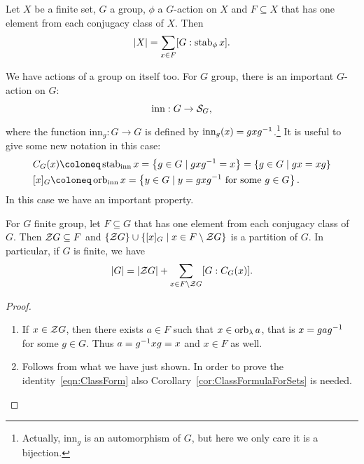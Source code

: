 \begin{corollary}\label{cor:ClassFormulaForSets}
Let \(X\) be a finite set, \(G\) a group, \(\phi\) a \(G\)-action on \(X\) and \(F \subseteq X\) that has one element from each conjugacy class of \(X\). Then
\[\left\lvert X\right\rvert = \sum_{x \in F} [G : \operatorname{stab}_\phi x] .\]
\end{corollary}

We have actions of a group on itself too. For \(G\) group, there is an important \(G\)-action on \(G\):
\[\text{inn} : G \to \mathcal S_G ,\]
where the function \(\text{inn}_g : G \to G\) is defined by \(\text{inn}_g(x) = g xg^{-1}\).\footnote{Actually, \(\text{inn}_g\) is an automorphism of \(G\), but here we only care it is a bijection.} It is useful to give some new notation in this case:
\begin{align*}
& C_G(x) \coloneq \stab_{\text{inn}} x = \set{g \in G \mid g x \inv g = x} = \set{g \in G \mid gx = xg} \\
& [x]_G \coloneq \orb_{\text{inn}} x = \set{y \in G \mid y = g x \inv g \text{ for some } g \in G} .
\end{align*}
In this case we have an important property.

\begin{proposition}\label{prop:ClassFormulaForGroups}
For \(G\) finite group, let \(F \subseteq G\) that has one element from each conjugacy class of \(G\). Then \(\mathcal Z G \subseteq F\) and \(\left\{\mathcal Z G\right\} \cup \left\{[x]_G \mid x \in F \setminus \mathcal Z G\right\}\) is a partition of \(G\). In particular, if \(G\) is finite, we have
\begin{equation}\left\lvert G\right\rvert = \left\lvert\mathcal Z G\right\rvert + \sum_{x \in F \setminus \mathcal Z G} [G:C_G(x)] .\label{eqn:ClassForm}\end{equation}
\end{proposition}

\begin{proof}
\begin{enumerate}
\item If \(x \in \mathcal Z G\), then there exists \(a \in F\) such that \(x \in \operatorname{orb}_\lambda a\), that is \(x = g a g^{-1}\) for some \(g \in G\). Thus \(a = g^{-1} x g = x\) and \(x \in F\) as well.
\item Follows from what we have just shown. In order to prove the identity~\eqref{eqn:ClassForm} also Corollary~\ref{cor:ClassFormulaForSets} is needed.\qedhere
\end{enumerate}
\end{proof}

